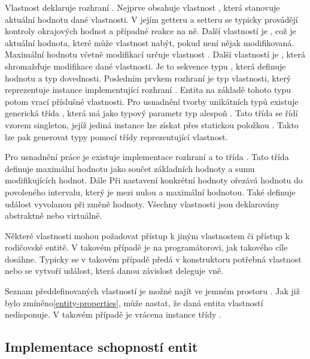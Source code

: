 Vlastnost deklaruje rozhraní . Nejprve obsahuje vlastnost , která stanovuje aktuální hodnotu
dané vlastnosti. V jejím getteru a setteru se typicky provádějí kontroly okrajových hodnot a případné reakce na ně. 
Další vlastností je , což je aktuální hodnota, které může vlastnost nabýt, pokud není nějak modifikovaná.
Maximální hodnotu včetně modifikací určuje vlastnost . Další vlastností je , která shromažďuje
modifikace dané vlastnosti. Je to sekvence typu , která definuje hodnotu a typ dovednosti. Posledním
prvkem rozhraní je typ vlastnosti, který reprezentuje instance implementující rozhraní .
Entita na základě tohoto typu potom vrací příslušné vlastnosti. 
Pro usnadnění tvorby unikátních typů existuje generická třída , která má jako typový parametr typ alespoň .
Tato třída se řídí vzorem singleton, jejíž jediná instance lze získat přes statickou položkou . Takto lze pak 
generovat typy pomocí třídy reprezentující vlastnost.

Pro usnadnění práce je existuje implementace rozhraní  a to třída . Tato třída definuje 
maximální hodnotu jako součet základních hodnoty a sumu modifikujících hodnot. Dále Při nastavení konkrétní hodnoty ořezává
hodnotu do povoleného intervalu, který je mezi nulou a maximální hodnotou. Také definuje událost vyvolanou při změně hodnoty.
Všechny vlastnosti jsou deklarovány abstraktně nebo virtuálně. 

 Některé vlastnosti mohou požadovat přístup k jiným vlastnostem či přístup k rodičovské entitě. V takovém
 případě je na programátorovi, jak takového cíle dosáhne. Typicky se v takovém případě předá v konstruktoru
 potřebná vlastnost nebo se vytvoří událost, která danou závislost deleguje vně. 

 Seznam předdefinovaných vlastností je možné najít ve jemném prostoru .
 Jak již bylo zmíněno\vref{entity-properties}, může nastat, že daná entita vlastností nedisponuje. V takovém případě 
 je vrácena instance třídy . 

\subsection{Implementace schopností entit}

